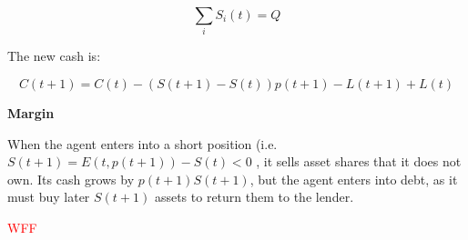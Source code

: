 \documentclass{article}
\begin{document}
\begin{equation}
    \sum_i S_i(t) = Q
\end{equation}

The new cash is:

\begin{equation}
    C(t+1) = C(t) - (S(t+1) - S(t))p(t+1) - L(t+1) + L(t)
\end{equation}

\textbf{Margin}

When the agent enters into a short position (i.e. $S(t+1) = E(t,p(t+1)) - S(t) < 0$ , it sells asset shares that it does not own. Its cash grows by $p(t+1)S(t+1)$, but the agent enters into debt, as it must buy later $S(t+1)$ assets to return them to the lender.

\textcolor{red}{WFF}




\end{document}
